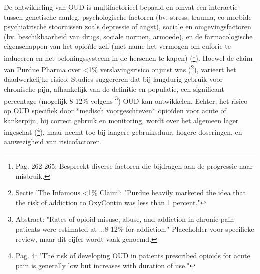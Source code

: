 \documentclass[11pt, a4paper]{report} %
\begin{document}
De ontwikkeling van OUD is multifactorieel bepaald en omvat een interactie tussen genetische aanleg, psychologische factoren (bv. stress, trauma, co-morbide psychiatrische stoornissen zoals depressie of angst), sociale en omgevingsfactoren (bv. beschikbaarheid van drugs, sociale normen, armoede), en de farmacologische eigenschappen van het opioïde zelf (met name het vermogen om euforie te induceren en het beloningssysteem in de hersenen te kapen) (\cite{Cicero2017Review}\footnote{Pag. 262-265: Bespreekt diverse factoren die bijdragen aan de progressie naar misbruik.}). Hoewel de claim van Purdue Pharma over <1\% verslavingsrisico onjuist was (\cite{HealthlineDopesickTruth}\footnote{Sectie 'The Infamous <1\% Claim': "Purdue heavily marketed the idea that the risk of addiction to OxyContin was less than 1 percent."}), varieert het daadwerkelijke risico. Studies suggereren dat bij langdurig gebruik voor chronische pijn, afhankelijk van de definitie en populatie, een significant percentage (mogelijk 8-12\% volgens \parencite{Vowles2015RatesOpioidMisuseChronicPain}\footnote{Abstract: "Rates of opioid misuse, abuse, and addiction in chronic pain patients were estimated at ...8-12\% for addiction." Placeholder voor specifieke review, maar dit cijfer wordt vaak genoemd.}) OUD kan ontwikkelen. Echter, het risico op OUD specifiek door *medisch voorgeschreven* opioïden voor acute of kankerpijn, bij correct gebruik en monitoring, wordt over het algemeen lager ingeschat (\cite{Hooten2021OpioidsChronicPain}\footnote{Pag. 4: "The risk of developing OUD in patients prescribed opioids for acute pain is generally low but increases with duration of use."}), maar neemt toe bij langere gebruiksduur, hogere doseringen, en aanwezigheid van risicofactoren.
\end{document}
